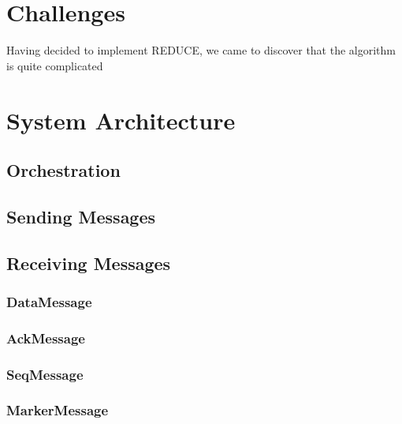 \documentclass{article}
\begin{document}
\section{Challenges}
Having decided to implement REDUCE, we came to discover that the algorithm is quite complicated








\section{System Architecture}

\subsection{Orchestration}

\subsection{Sending Messages}

\subsection{Receiving Messages}

\subsubsection{DataMessage}


\subsubsection{AckMessage}





\subsubsection{SeqMessage}


\subsubsection{MarkerMessage}
\end{document}
